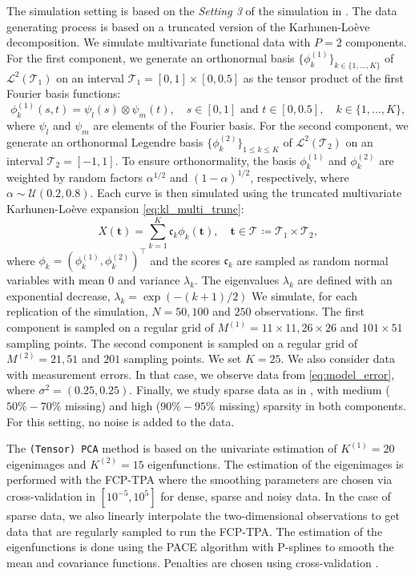 \documentclass[times,sort&compress,3p]{elsarticle}
\theoremstyle{plain}%
\theoremstyle{definition}
\newcommand{\TT}[1]{\mathcal{T}_{#1}} %
\newcommand{\sLp}[1]{\mathcal{L}^{2}(#1)} %
\newcommand{\pointt}{\mathbf{t}} %
\begin{document}
The simulation setting is based on the \emph{Setting 3} of the simulation in \cite{happMultivariateFunctionalPrincipal2018a}.
The data generating process is based on a truncated version of the Karhunen-Loève decomposition. We simulate multivariate functional data with $P = 2$ components. For the first component, we generate an orthonormal basis $\{\phi^{(1)}_k\}_{k \in \{1, \dots, K\}}$ of $\sLp{\TT{1}}$ on an interval $\TT{1} = [0, 1] \times [0, 0.5]$ as the tensor product of the first Fourier basis functions:
\begin{equation}
    \phi^{(1)}_k(s, t) = \psi_l(s) \otimes \psi_m(t), \quad s \in [0, 1] \text{ and } t \in [0, 0.5],\quad k \in \{1, \dots, K\},
\end{equation}
where $\psi_l$ and $\psi_m$ are elements of the Fourier basis. For the second component, we generate an orthonormal Legendre basis $\{\phi^{(2)}_k\}_{1 \leq k \leq K}$ of $\sLp{\TT{2}}$ on an interval $\TT{2} = [-1, 1]$. To ensure orthonormality, the basis $\phi^{(1)}_k$ and $\phi^{(2)}_k$ are weighted by random factors $\alpha^{1/2}$ and $(1 - \alpha)^{1/2}$, respectively, where $\alpha \sim \mathcal{U}(0.2, 0.8)$.
Each curve is then simulated using the truncated multivariate Karhunen-Loève expansion \eqref{eq:kl_multi_trunc}:
\begin{equation}
    X(\pointt) = \sum_{k = 1}^K \mathfrak{c}_k \phi_k(\pointt), \quad \pointt \in \TT{} \coloneqq \TT{1} \times \TT{2},
\end{equation}
where $\phi_k = (\phi^{(1)}_k, \phi^{(2)}_k)^\top$ and the scores $\mathfrak{c}_k$ are sampled as random normal variables with mean $0$ and variance $\lambda_k$. The eigenvalues $\lambda_k$ are defined with an exponential decrease, $\lambda_k = \exp(-(k + 1)/2)$ We simulate, for each replication of the simulation, $N = 50, 100$ and $250$ observations. The first component is sampled on a regular grid of $M^{(1)} = 11 \times 11, 26 \times 26$ and $101 \times 51$ sampling points. The second component is sampled on a regular grid of $M^{(2)} = 21, 51$ and $201$ sampling points. We set $K = 25$.
We also consider data with measurement errors. In that case, we observe data from \eqref{eq:model_error}, where $\sigma^2 = (0.25, 0.25)$. Finally, we study sparse data as in \cite{happMultivariateFunctionalPrincipal2018a}, with medium ($50\%-70\%$ missing) and high ($90\%-95\%$ missing) sparsity in both components. For this setting, no noise is added to the data.

The \texttt{(Tensor) PCA} method is based on the univariate estimation of $K^{(1)} = 20$ eigenimages and $K^{(2)} = 15$ eigenfunctions. The estimation of the eigenimages is performed with the FCP-TPA where the smoothing parameters are chosen via cross-validation in $[10^{-5}, 10^5]$ for dense, sparse and noisy data. In the case of sparse data, we also linearly interpolate the two-dimensional observations to get data that are regularly sampled to run the FCP-TPA. The estimation of the eigenfunctions is done using the PACE algorithm \citep{yaoFunctionalDataAnalysis2005} with P-splines to smooth the mean and covariance functions. Penalties are chosen using cross-validation \citep{eilersFlexibleSmoothingBsplines1996}.
\end{document}
